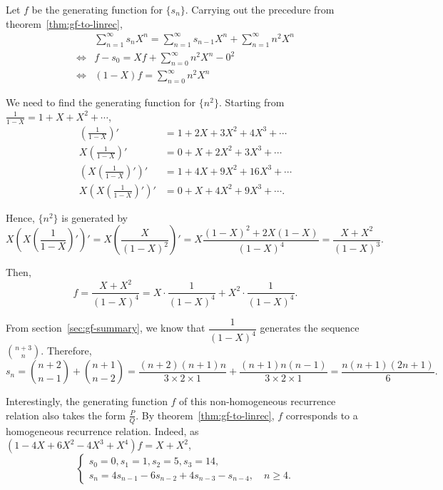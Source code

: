 \documentclass[a4paper, 12pt]{report}
\begin{document}
Let $f$ be the generating function for $\{s_n\}$. Carrying out the precedure from theorem~\ref{thm:gf-to-linrec},
\begin{align*}
&\sum_{n = 1}^\infty s_n X^n = \sum_{n = 1}^\infty s_{n - 1}X^n + \sum_{n = 1}^\infty n^2 X^n\\
\iff &f - s_0 = X f + \sum_{n = 0}^\infty n^2 X^n - 0^2\\
\iff &(1 - X)f = \sum_{n = 0}^\infty n^2 X^n
\end{align*}

We need to find the generating function for $\{n^2\}$. Starting from $\frac{1}{1 - X} = 1 + X + X^2 + \cdots$,
\begin{align*}
    \left(\frac{1}{1 - X}\right)' &= 1 + 2X + 3X^2 + 4X^3 + \cdots\\
    X \left(\frac{1}{1 - X}\right)' &= 0 + X + 2X^2 + 3 X^3 + \cdots\\
    \left(X \left(\frac{1}{1 - X}\right)'\right)' &= 1 + 4X + 9X^2 + 16X^3 + \cdots\\
    X \left(X \left(\frac{1}{1 - X}\right)'\right)' &= 0 + X + 4X^2 + 9 X^3 + \cdots.
\end{align*}

Hence, $\{n^2\}$ is generated by 
\[X \left(X \left(\frac{1}{1 - X}\right)'\right)' = X \left( \frac{X}{(1 - X)^2} \right)' = X \frac{(1 - X)^2 + 2 X (1 - X)}{(1 - X)^4} = \frac{X + X^2}{(1 - X)^3}.\]

Then, 
\[f = \frac{X + X^2}{(1 - X)^4} = X \cdot \frac{1}{(1 - X)^4} + X^2 \cdot \frac{1}{(1 - X)^4}.\]

From section~\ref{sec:gf-summary}, we know that $\dfrac{1}{(1 - X)^4}$ generates the sequence $\binom{n + 3}{n}$. Therefore,
\[s_n = \binom{n + 2}{n - 1} + \binom{n + 1}{n - 2} = \frac{(n + 2) (n + 1) n}{3 \times 2 \times 1} + \frac{(n + 1) n (n - 1)}{3 \times 2 \times 1} = \frac{n (n + 1) (2n + 1)}{6}.\]

Interestingly, the generating function $f$ of this non-homogeneous recurrence relation also takes the form $\frac{P}{Q}$. By theorem~\ref{thm:gf-to-linrec}, $f$ corresponds to a homogeneous recurrence relation. Indeed, as $(1 - 4X + 6X^2 - 4X^3 + X^4) f = X + X^2$,
\[
\begin{cases}
s_0 = 0, s_1 = 1, s_2 = 5, s_3 = 14,\\
s_n = 4s_{n - 1} - 6s_{n - 2} + 4 s_{n - 3} - s_{n - 4}, \quad n \geq 4.
\end{cases}
\]
\end{document}

